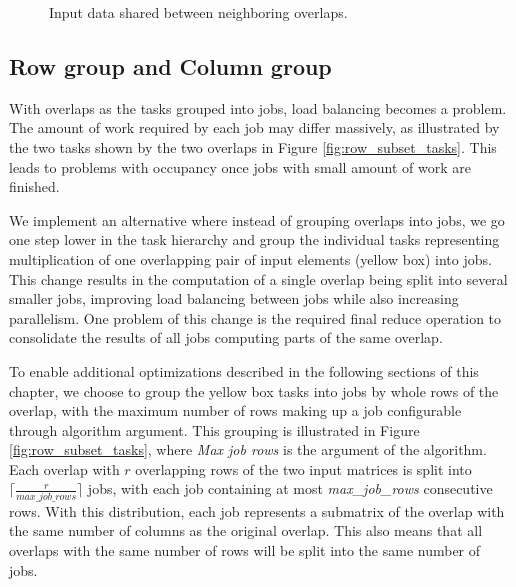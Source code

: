 \begin{figure}[ht]
	\centering
	\def\svgwidth{0.4\textwidth}
	\fontsize{8}{10}\selectfont
	
	\caption{Input data shared between neighboring overlaps.}
	\label{fig:multirow_shared_input}
\end{figure}

\subsection{Row group and Column group}
\label{sec:data_reuse_row_column_group}


With overlaps as the tasks grouped into jobs, load balancing becomes a problem. The amount of work required by each job may differ massively, as illustrated by the two tasks shown by the two overlaps in Figure \ref{fig:row_subset_tasks}. This leads to problems with occupancy once jobs with small amount of work are finished. 

We implement an alternative where instead of grouping overlaps into jobs, we go one step lower in the task hierarchy and group the individual tasks representing multiplication of one overlapping pair of input elements (yellow box) into jobs. This change results in the computation of a single overlap being split into several smaller jobs, improving load balancing between jobs while also increasing parallelism. One problem of this change is the required final reduce operation to consolidate the results of all jobs computing parts of the same overlap.

To enable additional optimizations described in the following sections of this chapter, we choose to group the yellow box tasks into jobs by whole rows of the overlap, with the maximum number of rows making up a job configurable through algorithm argument. This grouping is illustrated in Figure \ref{fig:row_subset_tasks}, where \textit{Max job rows} is the argument of the algorithm. Each overlap with $r$ overlapping rows of the two input matrices is split into $\lceil \frac{r}{max\_job\_rows} \rceil$ jobs, with each job containing at most \textit{max\_job\_rows} consecutive rows. With this distribution, each job represents a submatrix of the overlap with the same number of columns as the original overlap. This also means that all overlaps with the same number of rows will be split into the same number of jobs.

